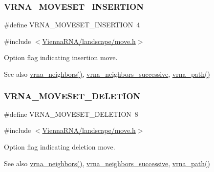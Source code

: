 \subsubsection{\texorpdfstring{VRNA\_MOVESET\_INSERTION}{VRNA\_MOVESET\_INSERTION}}
{\footnotesize\ttfamily \#define V\+R\+N\+A\+\_\+\+M\+O\+V\+E\+S\+E\+T\+\_\+\+I\+N\+S\+E\+R\+T\+I\+ON~4}



{\ttfamily \#include $<$\mbox{\hyperlink{move_8h}{Vienna\+R\+N\+A/landscape/move.\+h}}$>$}



Option flag indicating insertion move. 

\begin{DoxySeeAlso}{See also}
\mbox{\hyperlink{group__neighbors_ga4f8eefae08c05f5a49a4d4ee5d02e32f}{vrna\+\_\+neighbors()}}, \mbox{\hyperlink{group__neighbors_gae5aaa1c5a1f22e889843f3edbdd04714}{vrna\+\_\+neighbors\+\_\+successive}}, \mbox{\hyperlink{group__paths__walk_gaef7afadc36933b80706de49fe36e7b94}{vrna\+\_\+path()}} 
\end{DoxySeeAlso}
\mbox{\label{group__neighbors_gac05db9392c6647e3e9a6982096c5b384}} 
\subsubsection{\texorpdfstring{VRNA\_MOVESET\_DELETION}{VRNA\_MOVESET\_DELETION}}
{\footnotesize\ttfamily \#define V\+R\+N\+A\+\_\+\+M\+O\+V\+E\+S\+E\+T\+\_\+\+D\+E\+L\+E\+T\+I\+ON~8}



{\ttfamily \#include $<$\mbox{\hyperlink{move_8h}{Vienna\+R\+N\+A/landscape/move.\+h}}$>$}



Option flag indicating deletion move. 

\begin{DoxySeeAlso}{See also}
\mbox{\hyperlink{group__neighbors_ga4f8eefae08c05f5a49a4d4ee5d02e32f}{vrna\+\_\+neighbors()}}, \mbox{\hyperlink{group__neighbors_gae5aaa1c5a1f22e889843f3edbdd04714}{vrna\+\_\+neighbors\+\_\+successive}}, \mbox{\hyperlink{group__paths__walk_gaef7afadc36933b80706de49fe36e7b94}{vrna\+\_\+path()}} 
\end{DoxySeeAlso}
\mbox{\label{group__neighbors_ga68ea27c81de4b74e48b775c04052590b}} 
